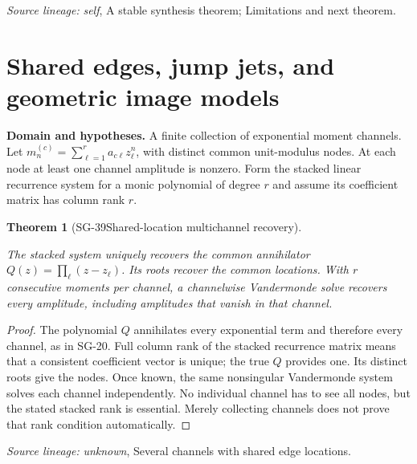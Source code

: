 \documentclass[11pt]{article}
\newtheorem{theorem}{Theorem}[section]
\theoremstyle{definition}\newtheorem{definition}[theorem]{Definition}
\theoremstyle{remark}\newtheorem{remark}[theorem]{Remark}
\begin{document}
\par{\small\color{Teal}\textit{Source lineage:} \textit{self}, A stable synthesis theorem; Limitations and next theorem.}\par

\section{Shared edges, jump jets, and geometric image models}


\par{\small\textbf{Domain and hypotheses.} A finite collection of exponential moment channels. Let $m_n^{(c)}=\sum_{\ell=1}^ra_{c\ell}z_\ell^n$, with distinct common unit-modulus nodes. At each node at least one channel amplitude is nonzero. Form the stacked linear recurrence system for a monic polynomial of degree $r$ and assume its coefficient matrix has column rank $r$.}\par
\begin{theorem}[SG-39\quad Shared-location multichannel recovery]\label{SG-39}

The stacked system uniquely recovers the common annihilator
$Q(z)=\prod_\ell(z-z_\ell)$. Its roots recover the common locations.
With $r$ consecutive moments per channel, a channelwise Vandermonde solve
recovers every amplitude, including amplitudes that vanish in that channel.

\end{theorem}
\begin{proof}

The polynomial $Q$ annihilates every exponential term and therefore every
channel, as in SG-20. Full column rank of the stacked recurrence matrix means
that a consistent coefficient vector is unique; the true $Q$ provides one.
Its distinct roots give the nodes. Once known, the same nonsingular
Vandermonde system solves each channel independently. No individual channel
has to see all nodes, but the stated stacked rank is essential. Merely
collecting channels does not prove that rank condition automatically.

\end{proof}

\par{\small\color{Teal}\textit{Source lineage:} \textit{unknown}, Several channels with shared edge locations.}\par
\end{document}
